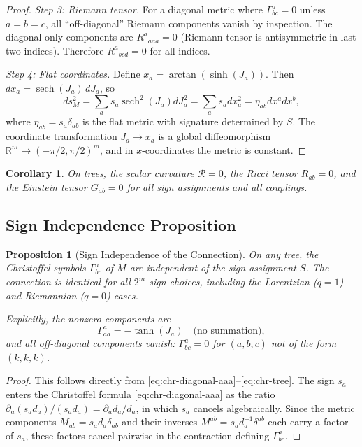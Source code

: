 \documentclass[11pt]{article}
\newtheorem{proposition}[theorem]{Proposition}
\newtheorem{corollary}[theorem]{Corollary}
\theoremstyle{definition}
\theoremstyle{remark}
\newcommand{\sgn}{S}
\newcommand{\Met}{M}
\newcommand{\Chr}[2]{\Gamma^{#1}_{#2}}
\newcommand{\sech}{\operatorname{sech}}
\newcommand{\Ein}{G}
\newcommand{\Ric}{R}
\newcommand{\Scal}{\mathcal{R}}
\begin{document}
\begin{proof}
\textit{Step 3: Riemann tensor.} For a diagonal metric where
$\Chr{a}{bc} = 0$ unless $a = b = c$, all ``off-diagonal'' Riemann
components vanish by inspection. The diagonal-only components are
$\Ric^a{}_{aaa} = 0$ (Riemann tensor is antisymmetric in last two
indices). Therefore $\Ric^a{}_{bcd} = 0$ for all indices.

\textit{Step 4: Flat coordinates.} Define $x_a = \arctan(\sinh(J_a))$.
Then $dx_a = \sech(J_a) \, dJ_a$, so
\begin{equation}
  ds^2_{\Met} = \sum_a s_a \sech^2(J_a) dJ_a^2
    = \sum_a s_a dx_a^2
    = \eta_{ab} dx^a dx^b,
  \label{eq:flat-coordinates}
\end{equation}
where $\eta_{ab} = s_a \delta_{ab}$ is the flat metric with signature
determined by $\sgn$. The coordinate transformation $J_a \to x_a$ is
a global diffeomorphism $\mathbb{R}^m \to (-\pi/2, \pi/2)^m$, and in
$x$-coordinates the metric is constant.
\end{proof}

\begin{corollary}
On trees, the scalar curvature $\Scal = 0$, the Ricci tensor
$\Ric_{ab} = 0$, and the Einstein tensor $\Ein_{ab} = 0$ for all
sign assignments and all couplings.
\end{corollary}

\subsection{Sign Independence Proposition}
\label{subsec:sign-indep}

\begin{proposition}[Sign Independence of the Connection]
\label{prop:sign-indep}
On any tree, the Christoffel symbols $\Chr{a}{bc}$ of $\Met$ are
independent of the sign assignment $\sgn$. The connection is identical
for all $2^m$ sign choices, including the Lorentzian ($q = 1$) and
Riemannian ($q = 0$) cases.

Explicitly, the nonzero components are
\begin{equation}
  \Chr{a}{aa} = -\tanh(J_a) \quad \text{(no summation)},
  \label{eq:chr-tree-explicit}
\end{equation}
and all off-diagonal components vanish: $\Chr{a}{bc} = 0$ for
$(a, b, c)$ not of the form $(k, k, k)$.
\end{proposition}

\begin{proof}
This follows directly from \eqref{eq:chr-diagonal-aaa}--\eqref{eq:chr-tree}.
The sign $s_a$ enters the Christoffel formula \eqref{eq:chr-diagonal-aaa}
as the ratio $\partial_a(s_a d_a)/(s_a d_a) = \partial_a d_a / d_a$,
in which $s_a$ cancels algebraically. Since the metric components
$\Met_{ab} = s_a d_a \delta_{ab}$ and their inverses
$\Met^{ab} = s_a d_a^{-1} \delta^{ab}$ each carry a factor of $s_a$,
these factors cancel pairwise in the contraction defining $\Chr{a}{bc}$.
\end{proof}
\end{document}
